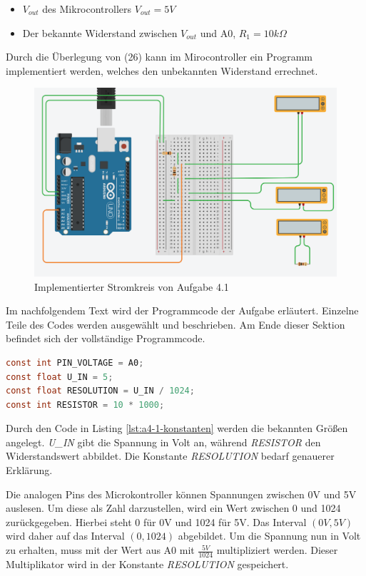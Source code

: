 \begin{itemize}
    \item $V_{out}$ des Mikrocontrollers $V_{out} = 5V$
    \item Der bekannte Widerstand zwischen $V_{out}$ und A0, $R_1 = 10k\Omega$
\end{itemize}

Durch die Überlegung von (26) kann im Mirocontroller ein Programm implementiert werden, welches den unbekannten Widerstand errechnet.

\begin{figure}[ht]
\centering
\includegraphics[width=\textwidth]{pictures/a4-1-praktik.png}
\caption{Implementierter Stromkreis von Aufgabe 4.1}
\label{fig:a4-1-implemtierung}
\end{figure}

Im nachfolgendem Text wird der Programmcode der Aufgabe erläutert.
Einzelne Teile des Codes werden ausgewählt und beschrieben.
Am Ende dieser Sektion befindet sich der vollständige Programmcode.

\begin{lstlisting}[language=C,label={lst:a4-1-konstanten}, caption={Konstanten der Aufgabe 4.1}]
const int PIN_VOLTAGE = A0;
const float U_IN = 5;
const float RESOLUTION = U_IN / 1024;
const int RESISTOR = 10 * 1000;
\end{lstlisting}

Durch den Code in Listing \ref{lst:a4-1-konstanten} werden die bekannten Größen angelegt.
\textit{U\_IN} gibt die Spannung in Volt an, während \textit{RESISTOR} den Widerstandswert abbildet.
Die Konstante \textit{RESOLUTION} bedarf genauerer Erklärung.

Die analogen Pins des Microkontroller können Spannungen zwischen 0V und 5V auslesen.
Um diese als Zahl darzustellen, wird ein Wert zwischen 0 und 1024 zurückgegeben.
Hierbei steht 0 für 0V und 1024 für 5V.
Das Interval $(0V, 5V)$ wird daher auf das Interval $(0, 1024)$ abgebildet.
Um die Spannung nun in Volt zu erhalten, muss mit der Wert aus A0 mit $\frac{5V}{1024}$ multipliziert werden.
Dieser Multiplikator wird in der Konstante \textit{RESOLUTION} gespeichert.

